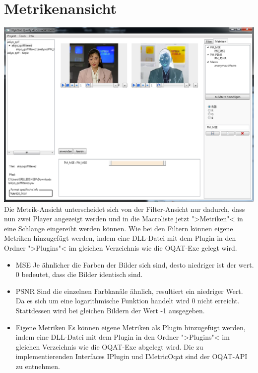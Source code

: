 \chapter{Metrikenansicht}
\includegraphics[scale=0.55]{bilder/Metriken.png}\\[5ex]
Die Metrik-Ansicht unterscheidet sich von der Filter-Ansicht nur dadurch, dass nun zwei Player angezeigt werden und in die Macroliste jetzt ">Metriken"< in eine Schlange eingereiht werden können.
Wie bei den Filtern können eigene Metriken hinzugefügt werden, indem eine DLL-Datei mit dem Plugin in den Ordner ">Plugins"< im gleichen Verzeichnis wie die OQAT-Exe gelegt wird.


\begin{itemize}
\item MSE \newline
Je ähnlicher die Farben der Bilder sich sind, desto niedriger ist der wert. 0 bedeutet, dass die Bilder identisch sind.
\item PSNR \newline
Sind die einzelnen Farbkanäle ähnlich, resultiert ein niedriger Wert. Da es sich um eine logarithmische Funktion handelt wird 0 nicht erreicht. Stattdessen wird bei gleichen Bildern der Wert -1 ausgegeben.
\item Eigene Metriken \newline
Es können eigene Metriken als Plugin hinzugefügt werden, indem eine DLL-Datei mit dem Plugin in den Ordner ">Plugins"< im gleichen Verzeichnis wie die OQAT-Exe abgelegt wird. Die zu implementierenden Interfaces IPlugin und IMetricOqat sind der OQAT-API zu entnehmen.
\end{itemize}
